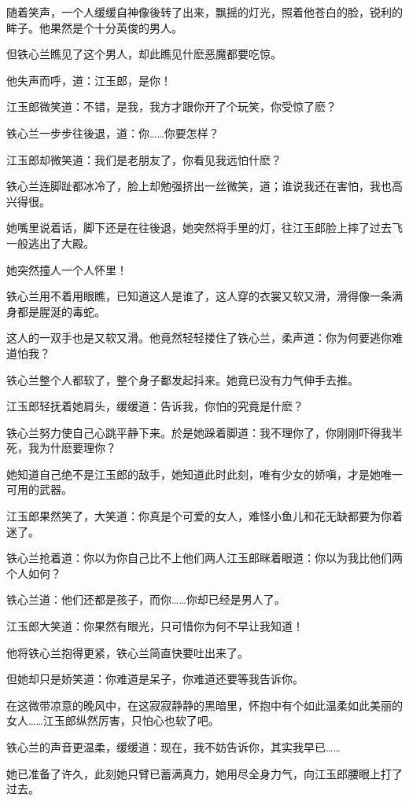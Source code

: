 \documentclass[12pt,oneside]{book}
\begin{document}
随着笑声，一个人缓缓自神像後转了出来，飘摇的灯光，照着他苍白的脸，锐利的眸子。他果然是个十分英俊的男人。

但铁心兰瞧见了这个男人，却此瞧见什麽恶魔都要吃惊。

他失声而呼，道：江玉郎，是你！

江玉郎微笑道：不错，是我，我方才跟你开了个玩笑，你受惊了麽？

铁心兰一步步往後退，道：你\ldots\ldots 你要怎样？

江玉郎却微笑道：我们是老朋友了，你看见我远怕什麽？

铁心兰连脚趾都冰冷了，脸上却勉强挤出一丝微笑，道；谁说我还在害怕，我也高兴得很。

她嘴里说着话，脚下还是在往後退，她突然将手里的灯，往江玉郎脸上摔了过去飞一般逃出了大殿。

她突然撞人一个人怀里！

铁心兰用不着用眼瞧，已知道这人是谁了，这人穿的衣裳又软又滑，滑得像一条满身都是腥涎的毒蛇。

这人的一双手也是又软又滑。他竟然轻轻搂住了铁心兰，柔声道：你为何要逃你难道怕我？

铁心兰整个人都软了，整个身子鄱发起抖来。她竟已没有力气伸手去推。

江玉郎轻抚着她肩头，缓缓道：告诉我，你怕的究竟是什麽？

铁心兰努力使自己心跳平静下来。於是她跺着脚道：我不理你了，你刚刚吓得我半死，我为什麽要理你？

她知道自己绝不是江玉郎的敌手，她知道此时此刻，唯有少女的娇嗔，才是她唯一可用的武器。

江玉郎果然笑了，大笑道：你真是个可爱的女人，难怪小鱼儿和花无缺都要为你着迷了。

铁心兰抢着道：你以为你自己比不上他们两人江玉郎眯着眼道：你以为我比他们两个人如何？

铁心兰道：他们还都是孩子，而你\ldots\ldots 你却已经是男人了。

江玉郎大笑道：你果然有眼光，只可惜你为何不早让我知道！

他将铁心兰抱得更紧，铁心兰简直快要吐出来了。

但她却只是娇笑道：你难道是呆子，你难道还要等我告诉你。

在这微带凉意的晚风中，在这寂寂静静的黑暗里，怀抱中有个如此温柔如此美丽的女人\ldots\ldots 江玉郎纵然厉害，只怕心也软了吧。

铁心兰的声音更温柔，缓缓道：现在，我不妨告诉你，其实我早已\ldots\ldots{}

她已准备了许久，此刻她只臂已蓄满真力，她用尽全身力气，向江玉郎腰眼上打了过去。
\end{document}
